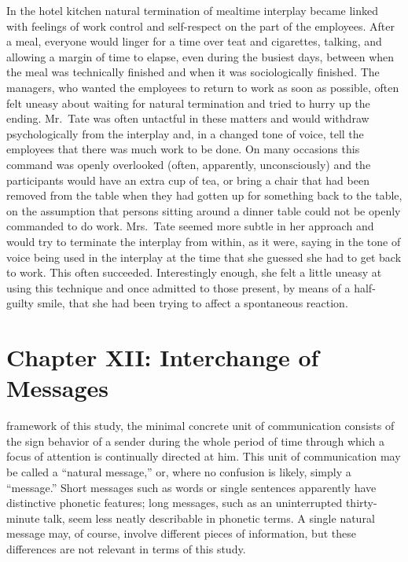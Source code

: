 \documentclass[openany,nobib]{tufte-book}
\let\oldchapter\chapter
\def\chapter{%
  \setcounter{footnote}{0}%
  \oldchapter
}
\begin{document}
In the hotel kitchen natural termination of mealtime interplay became
linked with feelings of work control and self-respect on the part of the
employees. After a meal, everyone would linger for a time over teat and
cigarettes, talking, and allowing a margin of time to elapse, even
during the busiest days, between when the meal was technically finished
and when it was sociologically finished. The managers, who wanted the
employees to return to work as soon as possible, often felt uneasy about
waiting for natural termination and tried to hurry up the ending.
Mr.~Tate was often untactful in these matters and would withdraw
psychologically from the interplay and, in a changed tone of voice, tell
the employees that there was much work to be done. On many occasions
this command was openly overlooked (often, apparently, unconsciously)
and the participants would have an extra cup of tea, or bring a chair
that had been removed from the table when they had gotten up for
something back to the table, on the assumption that persons sitting
around a dinner table could not be openly commanded to do work.
Mrs.~Tate seemed more subtle in her approach and would try to terminate
the interplay from within, as it were, saying in the tone of voice being
used in the interplay at the time that she guessed she had to get back
to work. This often succeeded. Interestingly enough, she felt a little
uneasy at using this technique and once admitted to those present, by
means of a half-guilty smile, that she had been trying to affect a
spontaneous reaction.

\chapter[CHAPTER XII: INTERCHANGE OF MESSAGES]{Chapter XII: Interchange of Messages}
\label{ch:Chapter XII: Interchange of Messages}

framework of this study, the minimal concrete unit of
communication consists of the sign behavior of a sender during the whole
period of time through which a focus of attention is continually
directed at him. This unit of communication may be called a ``natural
message,'' or, where no confusion is likely, simply a ``message.'' Short
messages such as words or single sentences apparently have distinctive
phonetic features; long messages, such as an uninterrupted thirty-minute
talk, seem less neatly describable in phonetic terms. A single natural
message may, of course, involve different pieces of information, but
these differences are not relevant in terms of this study.
\end{document}
